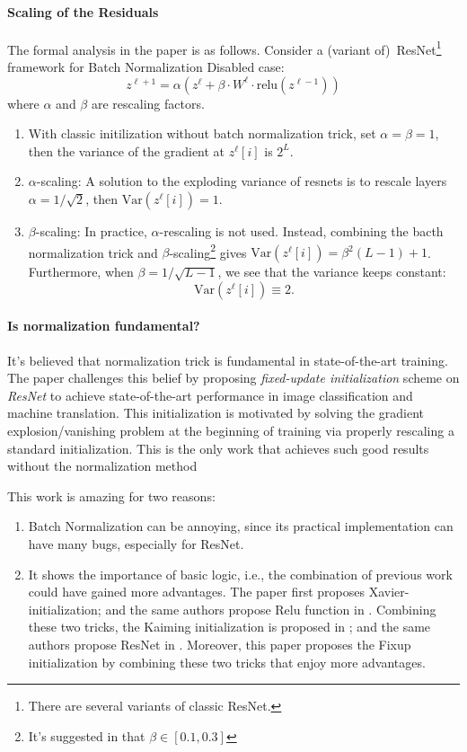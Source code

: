 \paragraph{Scaling of the Residuals}
The formal analysis in the paper \citep{Balduzzi2017} is as follows.
Consider a (variant of)~ResNet\footnote{There are several variants of classic ResNet.} framework for Batch Normalization Disabled case:
\[
z^{\ell+1} = \alpha(z^{\ell}+\beta\cdot W^{\ell}\cdot\text{relu}(z^{\ell-1}))
\]
where $\alpha$ and $\beta$ are rescaling factors.
\begin{enumerate}
\item
With classic initilization without batch normalization trick, set $\alpha=\beta=1$, then the variance of the gradient at $z^{\ell}[i]$ is $2^L$.
\item
$\alpha$-scaling: A solution to the exploding variance of resnets is to rescale
layers $\alpha=1/\sqrt{2}$, then $\text{Var}(z^{\ell}[i])=1$.
\item
$\beta$-scaling:
In practice, $\alpha$-rescaling is not used. Instead, combining the bacth normalization trick and $\beta$-scaling\footnote{It's suggested in \citep{Szegedy2016Inceptionv4IA} that $\beta\in[0.1,0.3]$} gives $\text{Var}(z^{\ell}[i])=\beta^2(L-1)+1$.
Furthermore, when $\beta=1/\sqrt{L-1}$, we see that the variance keeps constant:
\[
\text{Var}(z^{\ell}[i])\equiv2.
\]
\end{enumerate}
\paragraph{Is normalization fundamental?}
It's believed that normalization trick is fundamental in state-of-the-art training. The paper \citep{zhang2018residual} challenges this belief by proposing \emph{fixed-update initialization} scheme on \emph{ResNet} to achieve state-of-the-art performance in image classification and machine translation.
This initialization is motivated by solving the gradient explosion/vanishing problem
at the beginning of training via properly rescaling a standard initialization.
This is the only work that achieves such good results without the normalization method


This work is amazing for two reasons:
\begin{enumerate}
\item
Batch Normalization can be annoying, since its practical implementation can have many bugs, especially for ResNet.
\item
It shows the importance of basic logic, i.e., the combination of previous work could have gained more advantages.
The paper \citep{Glorot10understandingthe} first proposes Xavier-initialization; and the same authors propose Relu function in \citep{glorot2011relu}. 
Combining these two tricks, the Kaiming initialization is proposed in \citep{DDR2919332}; and the same authors propose ResNet in \citep{He2016res}.
Moreover, this paper proposes the Fixup initialization by combining these two tricks that enjoy more advantages.
\end{enumerate}

